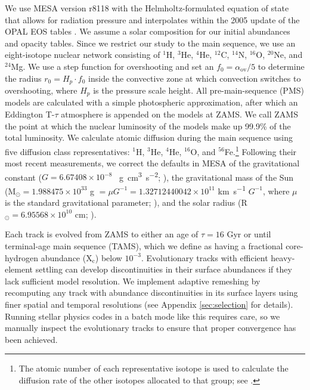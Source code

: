 \documentclass[iop,apj,twocolappendix]{emulateapj}
\begin{document}
We use MESA version r8118 with the Helmholtz-formulated equation of state that allows for radiation pressure and interpolates within the 2005 update of the OPAL EOS tables \citep{2002ApJ...576.1064R}. We assume a \citet{1998SSRv...85..161G} solar composition for our initial abundances and opacity tables. Since we restrict our study to the main sequence, we use an eight-isotope nuclear network consisting of $^1$H, $^3$He, $^4$He, $^{12}$C, $^{14}$N, $^{16}$O, $^{20}$Ne, and $^{24}$Mg. We use a step function for overshooting and set an $f_0 = \alpha_{\text{ov}}/5$ to determine the radius $r_0 = H_p \cdot f_0$ inside the convective zone at which convection switches to overshooting, where $H_p$ is the pressure scale height. %
All pre-main-sequence (PMS) models are calculated with a simple photospheric approximation, after which an Eddington T-$\tau$ atmosphere is appended on the models at ZAMS. We call ZAMS the point at which the nuclear luminosity of the models make up 99.9\% of the total luminosity. We calculate atomic diffusion during the main sequence using five diffusion class representatives: $^1$H, $^3$He, $^4$He, $^{16}$O, and $^{56}$Fe.\footnote{The atomic number of each representative isotope is used to calculate the diffusion rate of the other isotopes allocated to that group; see \citealt{Paxton2011}.} 
Following their most recent measurements, we correct the defaults in MESA of the gravitational constant ($G=6.67408\times 10^{-8}$ \si{\per\g\cm\cubed\per\square\s}; \citealt{2015arXiv150707956M}), the gravitational mass of the Sun (M$_\odot = 1.988475\times 10^{33}$ \si{\g} $= \mu G^{-1} = 1.32712440042\times 10^{11}$ \si{\km\per\s} $G^{-1}$, where $\mu$ is the standard gravitational parameter; \citealt{pitjeva2015determination}), and the solar radius (R$_\odot = 6.95568\times 10^{10}$ \si{\cm}; \citealt{2008ApJ...675L..53H}). 

Each track is evolved from ZAMS to either an age of $\tau=16$ Gyr or until terminal-age main sequence (TAMS), which we define as having a fractional core-hydrogen abundance (X$_{\text{c}}$) below $10^{-3}$. Evolutionary tracks with efficient heavy-element settling can develop discontinuities in their surface abundances if they lack sufficient model resolution. We implement adaptive remeshing by recomputing any track with abundance discontinuities in its surface layers using finer spatial and temporal resolutions (see Appendix \ref{sec:selection} for details). Running stellar physics codes in a batch mode like this requires care, so we manually inspect the evolutionary tracks to ensure that proper convergence has been achieved. %
\end{document}
